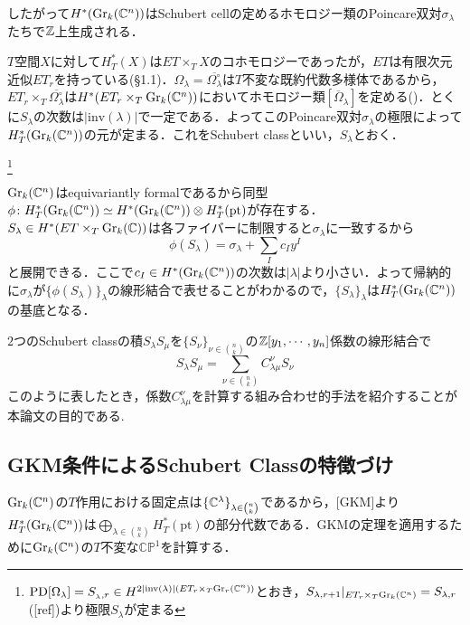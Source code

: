 したがって$H^*(\text{Gr}_k(\mathbb{C}^n))$はSchubert cellの定めるホモロジー類のPoincare双対$\sigma_\lambda$たちで$\mathbb{Z}$上生成される．

$T$空間$X$に対して$H^*_T(X)$は$ET\times_TX$のコホモロジーであったが，$ET$は有限次元近似$ET_r$を持っている(§1.1)．$\Omega_\lambda=\overline{\Omega_\lambda^\circ}$は$T$不変な既約代数多様体であるから，$ET_r\times_T\overline{\Omega_\lambda^\circ}$は$H^*(ET_r\times_T\text{Gr}_k(\mathbb{C}^n))$においてホモロジー類$[\overline{\Omega}_\lambda]$を定める(\cite{fulton young tableaux})．とくに$S_\lambda$の次数は$|\text{inv}(\lambda)|$で一定である．よってこのPoincare双対$\sigma_\lambda$の極限によって$H^*_T(\text{Gr}_k(\mathbb{C}^n))$の元が定まる．これをSchubert classといい，$S_\lambda$とおく．

\footnote{$\text{PD}[\Omega_\lambda]=S_{_\lambda,r}\in H^{{2|\text{inv}(\lambda)|}(ET_r\times_T\text{Gr}_r(\mathbb{C}^n))}$とおき，$S_{\lambda,r+1}|_{ET_r\times_T\text{Gr}_k(\mathbb{C}^n)}=S_{\lambda,r}$([ref])より極限$S_\lambda$が定まる}

$\text{Gr}_k(\mathbb{C}^n)$はequivariantly formalであるから同型
$\phi\colon H^*_T(\text{Gr}_k(\mathbb{C}^n))\simeq H^*(\text{Gr}_k(\mathbb{C}^n))\otimes H^*_T(\text{pt})$が存在する．$S_\lambda\in H^*(ET\times_T\text{Gr}_k(\mathbb{C}))$は各ファイバーに制限すると$\sigma_\lambda$に一致するから
\[
\phi(S_\lambda) = \sigma_\lambda + \sum_{I}c_Iy^I
\]
と展開できる．ここで$c_I\in H^*(\text{Gr}_k(\mathbb{C}^n))$の次数は$|\lambda|$より小さい．よって帰納的に$\sigma_\lambda$が$\{\phi(S_\lambda)\}_\lambda$の線形結合で表せることがわかるので，$\{S_\lambda\}_\lambda$は$H^*_T(\text{Gr}_k(\mathbb{C}^n))$の基底となる．


$2$つのSchubert classの積$S_\lambda S_\mu$を$\{S_\nu\}_{\nu\in\binom{n}{k}}$の$\mathbb{Z}[y_1,\cdots,y_n]$係数の線形結合で
\begin{equation}\label{LRcoeff}
  S_\lambda S_\mu=\sum_{\nu\in\binom{n}{k}}C^\nu_{\lambda\mu}S_\nu
\end{equation}
このように表したとき，係数$C^{\nu}_{\lambda\mu}$を計算する組み合わせ的手法を紹介することが本論文の目的である.





\subsection{GKM条件によるSchubert Classの特徴づけ}

$\text{Gr}_k(\mathbb{C}^n)$の$T$作用における固定点は$\{\mathbb{C}^\lambda\}_{\lambda\in\binom{n}{k}}$であるから，[GKM]より$H^*_T(\text{Gr}_k(\mathbb{C}^n))$は$\bigoplus_{\lambda\in\binom{n}{k}}H^*_T(\text{pt})$の部分代数である．GKMの定理を適用するために$\text{Gr}_k(\mathbb{C}^n)$の$T$不変な$\mathbb{CP}^1$を計算する．

